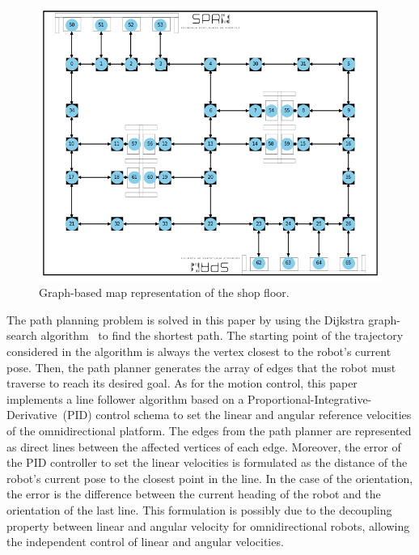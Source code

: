 \documentclass[conference]{IEEEtran}
\begin{document}
\begin{figure}[!t]
\centering
\centerline{\includegraphics[width=\columnwidth]{figures/navigation-graph.png}}
\caption{Graph-based map representation of the shop floor.}
\label{fig:navigation:graph}
\end{figure}

The path planning problem is solved in this paper by using the Dijkstra graph-search algorithm~\cite{dijkstra} to find the shortest path. The starting point of the trajectory considered in the algorithm is always the vertex closest to the robot's current pose.
Then, the path planner generates the array of edges that the robot must traverse to reach its desired goal.
As for the motion control, this paper implements a line follower algorithm based on a Proportional-Integrative-Derivative~(PID) control schema to set the linear and angular reference velocities of the omnidirectional platform.
The edges from the path planner are represented as direct lines between the affected vertices of each edge.
Moreover, the error of the PID controller to set the linear velocities is formulated as the distance of the robot's current pose to the closest point in the line.
In the case of the orientation, the error is the difference between the current heading of the robot and the orientation of the last line.
This formulation is possibly due to the decoupling property between linear and angular velocity for omnidirectional robots, allowing the independent control of linear and angular velocities.
\end{document}
